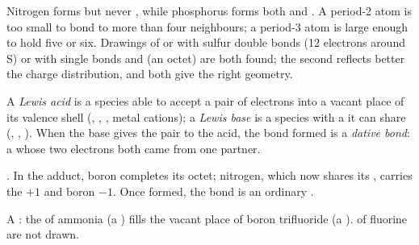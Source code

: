 \begin{remark}\label{rem:b1:lewis-resonance-vsepr:hypervalent}
Nitrogen forms  but never , while phosphorus forms both
 and . A period-2 atom is too small to bond to more than
four neighbours; a period-3 atom is large enough to hold five or six.
Drawings of  or  with sulfur double bonds (12
electrons around S) or with single bonds and  (an octet)
are both found; the second reflects better the charge distribution, and
both give the right geometry.
\end{remark}

\begin{definition}\label{def:b1:lewis-resonance-vsepr:lewis-acid}
A \emph{Lewis acid} is a species able to accept a
pair of electrons into a vacant place of its valence shell (,
, , metal cations); a \emph{Lewis base}
is a species with a  it can share (, ,
). When the base gives the pair to the acid, the bond formed is a
\emph{dative bond}: a  whose two
electrons both came from one partner.
\end{definition}

\begin{example}\label{ex:b1:lewis-resonance-vsepr:adduct}
. In the adduct, boron completes its octet;
nitrogen, which now shares its , carries the 
$+1$ and boron $-1$. Once formed, the  bond is an ordinary
.
\end{example}

\begin{omfigure}

{\small A : the  of ammonia (a ) fills the
vacant place of boron trifluoride (a ).  of fluorine
are not drawn.}
\end{omfigure}

